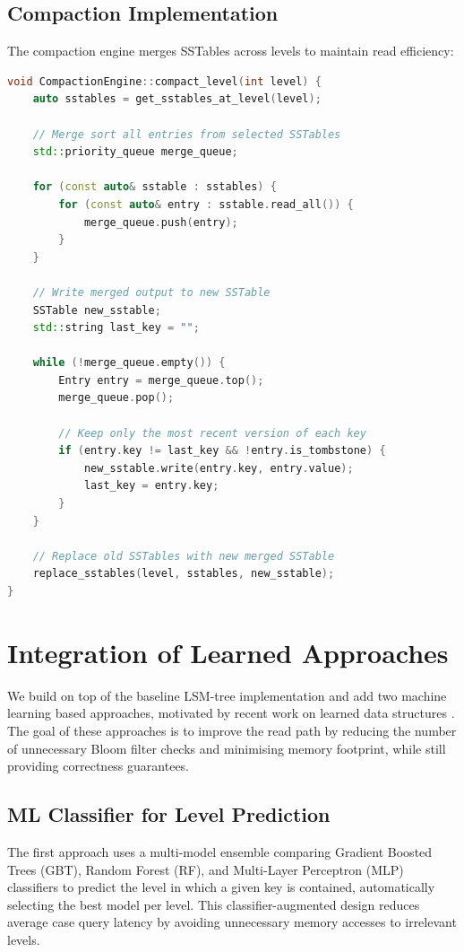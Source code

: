 \documentclass{mnitjaipur}
\begin{document}
\subsection{Compaction Implementation}
The compaction engine merges SSTables across levels to maintain read efficiency:

\begin{lstlisting}[language=C++, caption={Level-based compaction}, label={lst:compaction}]
void CompactionEngine::compact_level(int level) {
    auto sstables = get_sstables_at_level(level);
    
    // Merge sort all entries from selected SSTables
    std::priority_queue merge_queue;
    
    for (const auto& sstable : sstables) {
        for (const auto& entry : sstable.read_all()) {
            merge_queue.push(entry);
        }
    }
    
    // Write merged output to new SSTable
    SSTable new_sstable;
    std::string last_key = "";
    
    while (!merge_queue.empty()) {
        Entry entry = merge_queue.top();
        merge_queue.pop();
        
        // Keep only the most recent version of each key
        if (entry.key != last_key && !entry.is_tombstone) {
            new_sstable.write(entry.key, entry.value);
            last_key = entry.key;
        }
    }
    
    // Replace old SSTables with new merged SSTable
    replace_sstables(level, sstables, new_sstable);
}
\end{lstlisting}

\section{Integration of Learned Approaches}

We build on top of the baseline LSM-tree implementation and add two machine learning based approaches, motivated by recent work on learned data structures . The goal of these approaches is to improve the read path by reducing the number of unnecessary Bloom filter checks and minimising memory footprint, while still providing correctness guarantees.

\subsection{ML Classifier for Level Prediction}

The first approach uses a multi-model ensemble comparing Gradient Boosted Trees (GBT), Random Forest (RF), and Multi-Layer Perceptron (MLP) classifiers to predict the level in which a given key is contained, automatically selecting the best model per level. This classifier-augmented design reduces average case query latency by avoiding unnecessary memory accesses to irrelevant levels.
\end{document}
